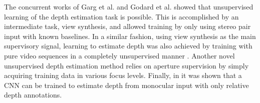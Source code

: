 The concurrent works of Garg et al. \cite{garg2016unsupervised} and Godard et al. \cite{monodepth17} showed that unsupervised learning of the depth estimation task is possible. This is accomplished by an intermediate task, view synthesis, and allowed training by only using stereo pair input with known baselines. In a similar fashion, using view synthesis as the main supervisory signal, learning to estimate depth was  also achieved by training with pure video sequences in a completely unsupervised manner \cite{zhou2017unsupervised,wang2017learning,mahjourian2018unsupervised,yang2017unsupervised,yin2018geonet}. Another novel unsupervised depth estimation method relies on aperture supervision \cite{srinivasan2017aperture} by simply acquiring training data in various focus levels. Finally, in \cite{chen2016single} it was shown that a CNN can be trained to estimate depth from monocular input with only relative depth annotations.